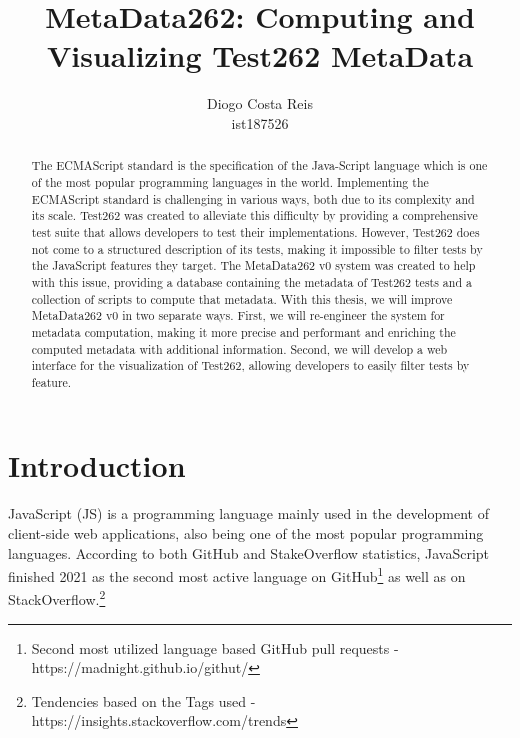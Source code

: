 \documentclass[runningheads]{llncs}
\title{MetaData262: Computing and Visualizing Test262 MetaData}
\subtitle{}
\author{Diogo Costa Reis\\ist187526\\
\email{diogo.costa.reis@tecnico.ulisboa.pt}}
\institute{Instituto Superior Técnico\\
Av. Rovisco Pais, 1\\
1049-001 Lisboa\\
Tel: +351 218 417 000\\
\email{mail@tecnico.ulisboa.pt}}
\begin{document}
{\def\addcontentsline#1#2#3{}\maketitle}

%
\begin{abstract}
The ECMAScript standard is the specification of the Java-Script language which is one of the most popular programming languages in the world. Implementing the ECMAScript standard is challenging in various ways, both due to its complexity and its scale. Test262 was created to alleviate this difficulty by providing a comprehensive test suite that allows developers to test their implementations.
%
However, Test262 does not come to a structured description of its tests, making it impossible to filter tests by the JavaScript features they target. The MetaData262 v0 system was created to help with this issue, providing a database containing the metadata of Test262 tests and a collection of scripts to compute that metadata.
%
With this thesis, we will improve MetaData262 v0 in two separate ways. First, we will re-engineer the system for metadata computation, making it more precise and performant and enriching the computed metadata with additional information. Second, we will develop a web interface for the visualization of Test262, allowing developers to easily filter tests by feature.

\end{abstract}


\newpage

\tableofcontents

\newpage

\section{Introduction}
\label{sec:Introduction}


JavaScript (JS) is a programming language mainly used in the development of client-side web applications, also being one of the most popular programming languages. According to both GitHub and StakeOverflow statistics, JavaScript finished 2021 as the second most active language on GitHub\footnote{Second most utilized language based GitHub pull requests - https://madnight.github.io/githut/} as well as on StackOverflow.\footnote{Tendencies based on the Tags used - https://insights.stackoverflow.com/trends}
\end{document}
